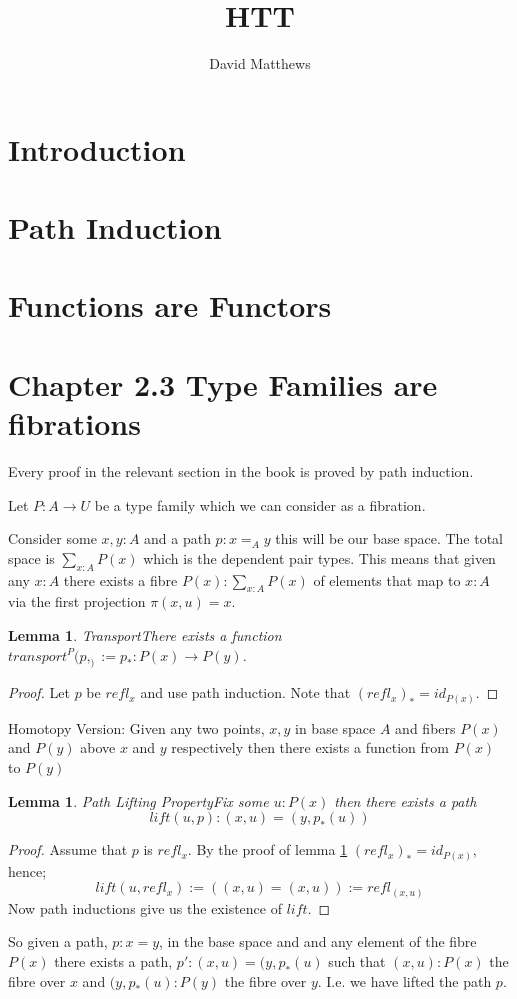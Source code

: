 \documentclass[12pt]{article} %
\title{HTT}
\author{David Matthews }
\newtheorem{lem}[thm]{Lemma}
\theoremstyle{definition}
\begin{document}
\section{Introduction}
\section{Path Induction}
\section{Functions are Functors}
 \section{Chapter 2.3 Type Families are fibrations}
Every proof in the relevant section in the book is proved by path induction.
   

Let $P:A \rightarrow U$ be a type family which we can consider as a fibration. 

Consider some $x,y:A$ and a path $p: x =_{A} y$ this will be our base space. The total space is $\sum_{x:A}P(x)$ which is the dependent pair types.  This means that given any $x:A$ there exists a fibre $P(x): \sum_{x:A}P(x)$ of elements that map to $x:A$ via the first projection $\pi(x,u) = x$.  

\begin{lem}{Transport}\label{lem:2.3.1}
 There exists a function $transport^{P}(p,_) := p_{*}: P(x) \rightarrow P(y)$.
\end{lem}

\begin{proof}
Let $p$ be $refl_{x}$ and use path induction. Note that $(refl_{x})_{*} = id_{P(x)}$.
\end{proof}

Homotopy Version:
Given any two points, $x,y$ in base space $A$ and fibers $P(x)$ and $P(y)$ above $x$ and $y$ respectively then there exists a function from $P(x)$ to $P(y)$ 



\begin{lem}{Path Lifting Property}\label{lem:2.3.2}
 Fix some $u:P(x)$ then there exists a path
 \[lift(u,p): (x,u) = (y,p_{*}(u))\]
\end{lem}

\begin{proof}
 Assume that $p$ is $refl_{x}$.  By the proof of lemma \ref{lem:2.3.1} $(refl_{x})_{*} = id_{P(x)}$, hence;
 \[lift(u,refl_{x}) := ((x,u) = (x,u)) := refl_{(x,u)}\]
 Now path inductions give us the existence of $lift$.  
\end{proof}
So given a path, $p: x=y$, in the base space and and any element of the fibre $P(x)$ there exists a path, $p': (x,u) = (y,p_{*}(u)$ such that $(x,u):P(x)$ the fibre over $x$ and $(y,p_{*}(u):P(y)$ the fibre over $y$.  I.e. we have lifted the path $p$.
\end{document}
